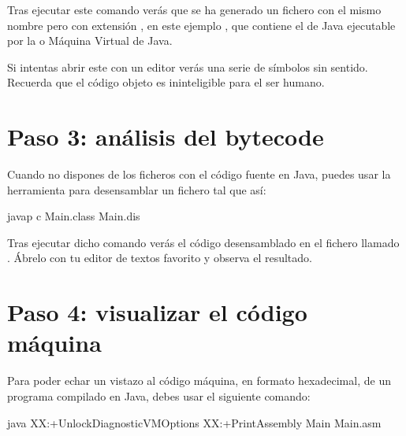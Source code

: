 \documentclass[letterpaper,10pt,spanish]{sphinxmanual}
\begin{document}
\sphinxAtStartPar
Tras ejecutar este comando verás que se ha generado un fichero con el mismo nombre pero con extensión , en este ejemplo , que contiene el  de Java ejecutable por la  o Máquina Virtual de Java.

\sphinxAtStartPar
Si intentas abrir este  con un editor verás una serie de símbolos sin sentido. Recuerda que el código objeto es ininteligible para el ser humano.


\section{Paso 3: análisis del bytecode}
\label{\detokenize{lab2:paso-3-analisis-del-bytecode}}
\sphinxAtStartPar
Cuando no dispones de los ficheros con el código fuente en Java, puedes usar la herramienta  para desensamblar un fichero  tal que así:

\begin{sphinxVerbatim}[commandchars=\\\{\}]
 javap \PYGZhy{}c Main.class \PYGZgt{} Main.dis
\end{sphinxVerbatim}

\sphinxAtStartPar
Tras ejecutar dicho comando verás el código desensamblado en el fichero llamado . Ábrelo con tu editor de textos favorito y observa el resultado.


\section{Paso 4: visualizar el código máquina}
\label{\detokenize{lab2:paso-4-visualizar-el-codigo-maquina}}
\sphinxAtStartPar
Para poder echar un vistazo al código máquina, en formato hexadecimal, de un programa compilado en Java, debes usar el siguiente comando:

\begin{sphinxVerbatim}[commandchars=\\\{\}]
 java \PYGZhy{}XX:+UnlockDiagnosticVMOptions \PYGZhy{}XX:+PrintAssembly Main \PYGZgt{} Main.asm
\end{sphinxVerbatim}
\end{document}
